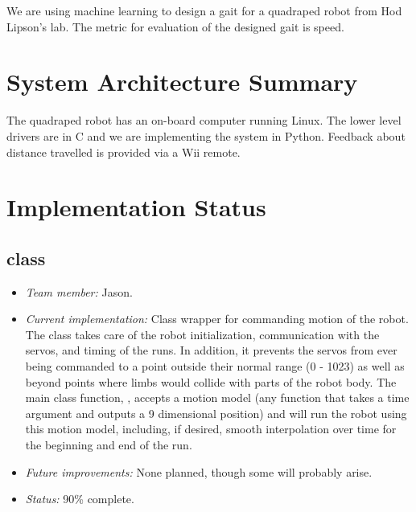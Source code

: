 We are using machine learning to design a gait for a quadraped robot
from Hod Lipson’s lab. The metric for evaluation of the designed gait
is speed.


\section{System Architecture Summary}

The quadraped robot has an on-board computer running Linux. The lower
level drivers are in C and we are implementing the system in
Python. Feedback about distance travelled is provided via a Wii remote. 


\section{Implementation Status}


\subsection*{ class}

\begin{itemize}
\item \emph{Team member:} Jason.
\item \emph{Current implementation:} Class wrapper for commanding
  motion of the robot.  The  class takes care of the robot
  initialization, communication with the servos, and timing of the
  runs.  In addition, it prevents the servos from ever being commanded
  to a point outside their normal range (0 - 1023) as well as beyond
  points where limbs would collide with parts of the robot body.  The
  main class function, , accepts a motion model (any
  function that takes a time argument and outputs a 9 dimensional
  position) and will run the robot using this motion model, including,
  if desired, smooth interpolation over time for the beginning and end
  of the run.
\item \emph{Future improvements:} None planned, though some will
  probably arise.
\item \emph{Status:} 90\% complete.
\end{itemize}



